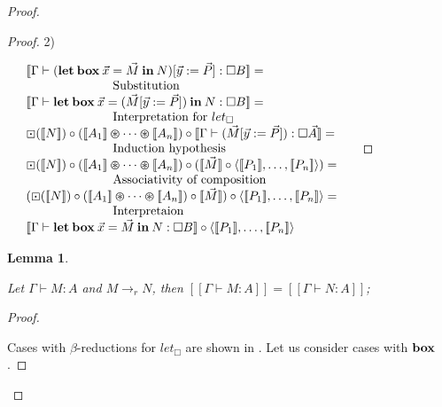 \documentclass[a4paper]{article}
\newtheorem{lemma}{Lemma}
\begin{document}
\begin{proof}
\begin{proof}
2)

\vspace{\baselineskip}

$\begin{array}{lll}
&[\![\Gamma \vdash ({\bf let \: box} \: \vec{x} = \vec{M} {\: \bf in \:} N) [\vec{y} := \vec{P}] : \Box B]\!] =& \\
&\quad\quad\quad\quad\quad\quad\quad \text{Substitution} &\\
&[\![\Gamma \vdash {\bf let \: box} \: \vec{x} = (\vec{M} [\vec{y} := \vec{P}]) {\: \bf in \:} N : \Box B]\!] =& \\
&\quad\quad\quad\quad\quad\quad\quad  \text{Interpretation for $let_{\Box}$} \\
&\boxdot ([\![N]\!]) \circ ([\![A_1]\!] \varoast \dots \varoast [\![A_n]\!]) \circ [\![\Gamma \vdash (\vec{M} [\vec{y} := \vec{P}]) : \Box \vec{A}]\!] =& \\
&\quad\quad\quad\quad\quad\quad\quad \text{Induction hypothesis}& \\
&\boxdot ([\![N]\!]) \circ ([\![A_1]\!] \varoast \dots \varoast [\![A_n]\!]) \circ ([\![\vec{M}]\!] \circ \langle [\![P_1]\!],\dots,[\![P_n]\!]\rangle) = & \\
&\quad\quad\quad\quad\quad\quad\quad \text{Associativity of composition}& \\
&(\boxdot ([\![N]\!]) \circ ([\![A_1]\!] \varoast \dots \varoast [\![A_n]\!]) \circ [\![\vec{M}]\!]) \circ \langle [\![P_1]\!],\dots,[\![P_n]\!]\rangle = & \\
&\quad\quad\quad\quad\quad\quad\quad \text{Interpretaion}& \\
&[\![\Gamma \vdash {\bf let \: box} \: \vec{x} = \vec{M} {\: \bf in \:} N : \Box B]\!] \circ \langle [\![P_1]\!],\dots,[\![P_n]\!]\rangle&
\end{array}$

\end{proof}

\begin{lemma}
  $ $

  Let $\Gamma \vdash M : A$ and $M \to_r N$, then $[\![\Gamma \vdash M : A]\!] = [\![\Gamma \vdash N : A]\!]$;
\end{lemma}

\begin{proof}
  $ $

Cases with $\beta$-reductions for $let_{\Box}$ are shown in \cite{ModalK1}. Let us consider cases with ${\bf box}$.

\vspace{\baselineskip}


\end{proof}
\end{proof}
\end{document}
